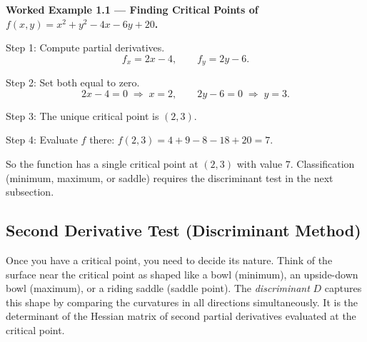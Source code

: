 \documentclass[12pt,a4paper]{article}
\begin{document}
\textbf{Worked Example 1.1 --- Finding Critical Points of $f(x,y) = x^{2} + y^{2} - 4x - 6y + 20$.}

Step 1: Compute partial derivatives.
\[
  f_x = 2x - 4, \qquad f_y = 2y - 6.
\]

Step 2: Set both equal to zero.
\[
  2x - 4 = 0 \;\Rightarrow\; x = 2, \qquad 2y - 6 = 0 \;\Rightarrow\; y = 3.
\]

Step 3: The unique critical point is $(2, 3)$.

Step 4: Evaluate $f$ there: $f(2,3) = 4 + 9 - 8 - 18 + 20 = 7$.

So the function has a single critical point at $(2,3)$ with value $7$. Classification (minimum, maximum, or saddle) requires the discriminant test in the next subsection.

\subsection{Second Derivative Test (Discriminant Method)}

Once you have a critical point, you need to decide its nature. Think of the surface near the critical point as shaped like a bowl (minimum), an upside-down bowl (maximum), or a riding saddle (saddle point). The \emph{discriminant} $D$ captures this shape by comparing the curvatures in all directions simultaneously. It is the determinant of the Hessian matrix of second partial derivatives evaluated at the critical point.
\end{document}
